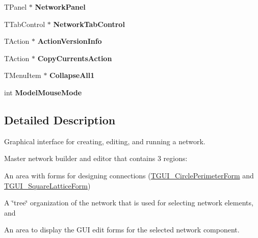 \begin{DoxyCompactItemize}
\item 
\hypertarget{class_t_network_g_u_i_a5fdd5dd306aa0ac455aca6bb792d9b72}{T\+Panel $\ast$ {\bfseries Network\+Panel}}\label{class_t_network_g_u_i_a5fdd5dd306aa0ac455aca6bb792d9b72}

\item 
\hypertarget{class_t_network_g_u_i_a4f3b92e132a0735d61f5e746c1fcf00b}{T\+Tab\+Control $\ast$ {\bfseries Network\+Tab\+Control}}\label{class_t_network_g_u_i_a4f3b92e132a0735d61f5e746c1fcf00b}

\item 
\hypertarget{class_t_network_g_u_i_a269417f3eb8d10576134809b9c312bb1}{T\+Action $\ast$ {\bfseries Action\+Version\+Info}}\label{class_t_network_g_u_i_a269417f3eb8d10576134809b9c312bb1}

\item 
\hypertarget{class_t_network_g_u_i_a9782b2344ac6181536a0c66984d70594}{T\+Action $\ast$ {\bfseries Copy\+Currents\+Action}}\label{class_t_network_g_u_i_a9782b2344ac6181536a0c66984d70594}

\item 
\hypertarget{class_t_network_g_u_i_a90aaebf113d9babf37b2851262f202aa}{T\+Menu\+Item $\ast$ {\bfseries Collapse\+All1}}\label{class_t_network_g_u_i_a90aaebf113d9babf37b2851262f202aa}

\item 
\hypertarget{class_t_network_g_u_i_a43e4e90e4968db4857a905f648bcec24}{int {\bfseries Model\+Mouse\+Mode}}\label{class_t_network_g_u_i_a43e4e90e4968db4857a905f648bcec24}

\end{DoxyCompactItemize}


\subsection{Detailed Description}
Graphical interface for creating, editing, and running a network. 

Master network builder and editor that contains 3 regions\+:
\begin{DoxyItemize}
\item An area with forms for designing connections (\hyperlink{class_t_g_u_i___circle_perimeter_form}{T\+G\+U\+I\+\_\+\+Circle\+Perimeter\+Form} and \hyperlink{class_t_g_u_i___square_lattice_form}{T\+G\+U\+I\+\_\+\+Square\+Lattice\+Form})
\item A \char`\"{}tree\char`\"{} organization of the network that is used for selecting network elements, and
\item An area to display the G\+U\+I edit forms for the selected network component.
\end{DoxyItemize}


